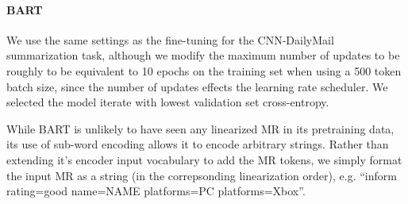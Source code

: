 %
%
%
%
%
%


\paragraph{BART}
We use the same settings as the fine-tuning for the CNN-DailyMail
summarization task,
although we modify the maximum number of updates to be roughly to be
equivalent to 10 epochs on the training set when using a 500 token batch
size, since
the number of updates effects
the learning rate scheduler. We selected the model iterate with
lowest validation set cross-entropy.

While BART is unlikely to have seen any linearized MR in its pretraining
data, its use of sub-word encoding  allows it to encode
arbitrary strings. Rather than extending it's encoder input vocabulary to
add the MR tokens, we simply format the input MR as a string
(in the correpsonding linearization order), e.g. ``inform rating=good name=NAME platforms=PC platforms=Xbox''.

